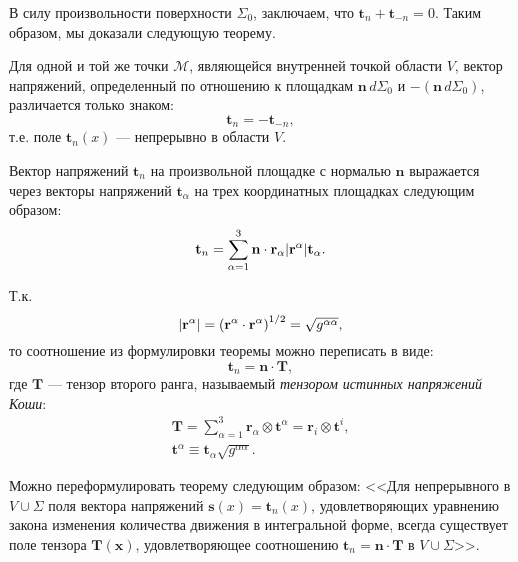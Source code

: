 В силу произвольности поверхности $\Sigma_0$, заключаем, что $\mathbf{t}_n + \mathbf{t}_{-n} = 0$. Таким образом, мы доказали следующую теорему. 

\begin{theorem*}
	Для одной и той же точки $\mathcal{M}$, являющейся внутренней точкой области $V$, вектор напряжений, определенный по отношению к площадкам $\mathbf{n} \, d\Sigma_0$ и $-(\mathbf{n} \, d\Sigma_0)$, различается только знаком:
	\begin{equation*}
		\mathbf{t}_{n} = - \mathbf{t}_{-n},
	\end{equation*}
	т.е. поле $\mathbf{t}_n(x)$ --- непрерывно в области $V$.
\end{theorem*}

\begin{theorem*}
	Вектор напряжений $\mathbf{t}_n$ на произвольной площадке с нормалью $\mathbf{n}$ выражается через векторы напряжений $\mathbf{t}_{\alpha}$ на трех координатных площадках следующим образом:
	\begin{equation*}
		\mathbf{t}_{n} = \sum\limits_{\alpha = 1}^{3} \mathbf{n} \cdot \mathbf{r}_{\alpha} \abs{\mathbf{r}^{\alpha}} \mathbf{t}_{\alpha}.
	\end{equation*}
	
	Т.к. 
	\begin{equation*}
		\abs{\mathbf{r}^{\alpha}} = \left(\mathbf{r}^{\alpha} \cdot \mathbf{r}^{\alpha}\right)^{1/2} = \sqrt{g^{\alpha\alpha}},
	\end{equation*}
	то соотношение из формулировки теоремы можно переписать в виде:
	\begin{equation*}
		\mathbf{t}_{n} = \mathbf{n} \cdot \mathbf{T},
	\end{equation*}
	где $\mathbf{T}$ --- тензор второго ранга, называемый \textit{тензором истинных напряжений Коши}:
	\begin{gather*}
		\mathbf{T} = \sum\limits_{\alpha = 1}^{3} \mathbf{r}_{\alpha} \otimes \mathbf{t}^{\alpha} = \mathbf{r}_{i} \otimes \mathbf{t}^i, \\
		\mathbf{t}^{\alpha} \equiv \mathbf{t}_{\alpha} \sqrt{g^{\alpha\alpha}}. 
	\end{gather*}
	
	Можно переформулировать теорему следующим образом: <<Для непрерывного в $V \cup \Sigma$ поля вектора напряжений $\mathbf{s}(x) = \mathbf{t}_n(x)$, удовлетворяющих уравнению закона изменения количества движения в интегральной форме, всегда существует поле тензора $\mathbf{T}(\mathbf{x})$, удовлетворяющее соотношению $\mathbf{t}_n = \mathbf{n} \cdot \mathbf{T}$ в $V \cup \Sigma$>>. 
\end{theorem*}